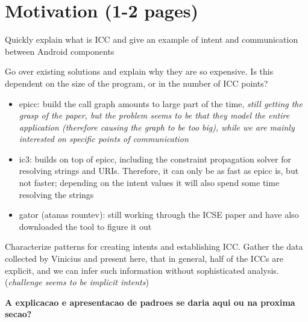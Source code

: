\section{Motivation (1-2 pages)}

Quickly explain what is ICC and give an example of intent and communication between Android components

Go over existing solutions and explain why they are so expensive. Is this dependent on the size of the program, or in the number of ICC points?
\begin{itemize}
 \item epicc: build the call graph amounts to large part of the time, \emph{still getting the grasp of the paper, but the problem seems to be that they model the entire application (therefore causing the graph to be too big), while we are mainly interested on specific points of communication}
 \item ic3: builds on top of epicc, including the constraint propagation solver for resolving strings and URIs. Therefore, it can only be as fast as epicc is, but not faster; depending on the intent values it will also spend some time resolving the strings
 \item gator (atanas rountev): still working through the ICSE paper and have also downloaded the tool to figure it out
\end{itemize}

Characterize patterns for creating intents and establishing ICC. Gather the data collected by Vinicius and present here, that in general, half of the ICCs are explicit, and we can infer such information without sophisticated analysis. (\emph{challenge seems to be implicit intents})

\textbf{A explicacao e apresentacao de padroes se daria aqui ou na proxima secao?}
